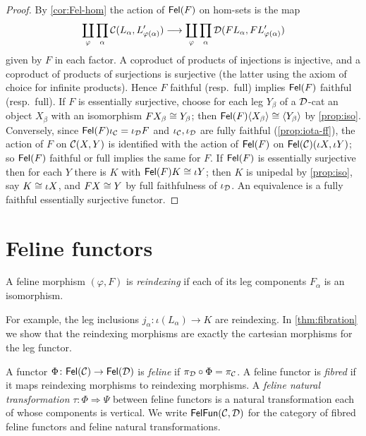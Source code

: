 \begin{proof}
By \cref{cor:Fel-hom} the action of $\mathsf{Fel}(F)$ on hom-sets is the map
\[
\coprod_{\varphi}\prod_{\alpha}\mathcal{C}(L_\alpha,L'_{\varphi(\alpha)})\longrightarrow\coprod_{\varphi}\prod_{\alpha}\mathcal{D}(FL_\alpha,FL'_{\varphi(\alpha)})
\]
given by $F$ in each factor. A coproduct of products of injections is
injective, and a coproduct of products of surjections is surjective (the
latter using the axiom of choice for infinite products). Hence $F$ faithful
(resp.\ full) implies $\mathsf{Fel}(F)$ faithful (resp.\ full). If $F$ is essentially
surjective, choose for each leg $Y_\beta$ of a $\mathcal{D}$-cat an object $X_\beta$
with an isomorphism $FX_\beta\cong Y_\beta$; then $\mathsf{Fel}(F)\langle X_\beta\rangle\cong\langle Y_\beta\rangle$
by \cref{prop:iso}. Conversely, since $\mathsf{Fel}(F)\iota_{\mathcal{C}}=\iota_{\mathcal{D}} F$ and
$\iota_{\mathcal{C}},\iota_{\mathcal{D}}$ are fully faithful (\cref{prop:iota-ff}), the action of
$F$ on $\mathcal{C}(X,Y)$ is identified with the action of $\mathsf{Fel}(F)$ on
$\mathsf{Fel}(\mathcal{C})(\iota X,\iota Y)$; so $\mathsf{Fel}(F)$ faithful or full implies the same
for $F$. If $\mathsf{Fel}(F)$ is essentially surjective then for each $Y$ there is $K$
with $\mathsf{Fel}(F)K\cong\iota Y$; then $K$ is unipedal by \cref{prop:iso}, say
$K\cong\iota X$, and $FX\cong Y$ by full faithfulness of $\iota_{\mathcal{D}}$. An
equivalence is a fully faithful essentially surjective functor.
\end{proof}

\section{Feline functors}\label{sec:feline-functors}

\begin{definition}\label{def:reindexing}
A feline morphism $(\varphi,F)$ is \emph{reindexing} if each of its leg
components $F_\alpha$ is an isomorphism.
\end{definition}

For example, the leg inclusions $j_\alpha\colon\iota(L_\alpha)\to K$ are
reindexing. In \cref{thm:fibration} we show that the reindexing morphisms are
exactly the cartesian morphisms for the leg functor.

\begin{definition}\label{def:feline-functor}
A functor $\Phi\colon\mathsf{Fel}(\mathcal{C})\to\mathsf{Fel}(\mathcal{D})$ is \emph{feline} if
$\pi_{\mathcal{D}}\circ\Phi=\pi_{\mathcal{C}}$. A feline functor is \emph{fibred} if it maps
reindexing morphisms to reindexing morphisms. A \emph{feline natural
transformation} $\tau\colon\Phi\Rightarrow\Psi$ between feline functors is a
natural transformation each of whose components is vertical. We write
$\mathsf{FelFun}(\mathcal{C},\mathcal{D})$ for the category of fibred feline functors and feline
natural transformations.
\end{definition}

